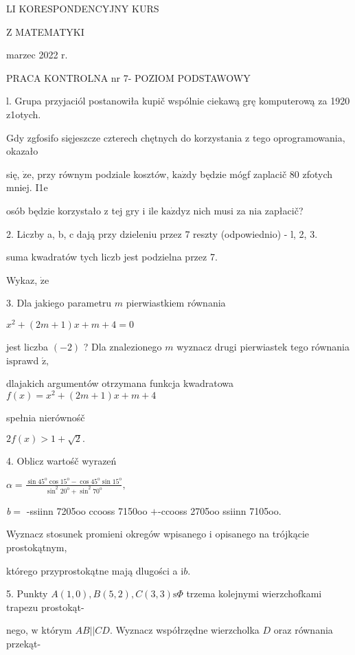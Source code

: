\documentclass[a4paper,12pt]{article}
\begin{document}
LI KORESPONDENCYJNY KURS

Z MATEMATYKI

marzec 2022 r.

PRACA KONTROLNA nr 7- POZIOM PODSTAWOWY

l. Grupa przyjaciól postanowiła kupič wspólnie ciekawą grę komputerową za 1920 z1otych.

Gdy zgfosifo sięjeszcze czterech chętnych do korzystania $\mathrm{z}$ tego oprogramowania, okazało

się, $\dot{\mathrm{z}}\mathrm{e}$, przy równym podziale kosztów, $\mathrm{k}\mathrm{a}\dot{\mathrm{z}}\mathrm{d}\mathrm{y}$ będzie mógf zaplacič 80 zfotych mniej. I1e

osób będzie korzystało $\mathrm{z}$ tej gry $\mathrm{i}$ ile $\mathrm{k}\mathrm{a}\dot{\mathrm{z}}\mathrm{d}\mathrm{y}\mathrm{z}$ nich musi za $\mathrm{n}\mathrm{i}\mathrm{a}$ zapłacič?

2. Liczby a, b, c dają przy dzieleniu przez 7 reszty (odpowiednio) - l, 2, 3.

suma kwadratów tych liczb jest podzielna przez 7.

Wykaz, $\dot{\mathrm{z}}\mathrm{e}$

3. Dla jakiego parametru $m$ pierwiastkiem równania

$x^{2}+(2m+1)x+m+4=0$

jest liczba $(-2)$ ? Dla znalezionego $m$ wyznacz drugi pierwiastek tego równania $\mathrm{i}\mathrm{s}$prawd $\acute{\mathrm{z}},$

dlajakich argumentów otrzymana funkcja kwadratowa $f(x)=x^{2}+(2m+1)x+m+4$

spełnia nierównośč

$2f(x)>1+\sqrt{2}.$

4. Oblicz wartośč wyrazeń

$\displaystyle \alpha=\frac{\sin 45^{\mathrm{o}}\cos 15^{\mathrm{o}}-\cos 45^{\mathrm{o}}\sin 15^{\mathrm{o}}}{\sin^{2}20^{\mathrm{o}}+\sin^{2}70^{\mathrm{o}}},$

{\it b}$=$ -ssiinn 7205oo ccooss 7150oo $+$-ccooss 2705oo ssiinn 7105oo.

Wyznacz stosunek promieni okregów wpisanego $\mathrm{i}$ opisanego na trójkącie prostokątnym,

którego przyprostokątne mają dlugości a $\mathrm{i}b.$

5. Punkty $A(1,0), B(5,2), C(3,3) \mathrm{s}\Phi$ trzema kolejnymi wierzchofkami trapezu prostokąt-

nego, $\mathrm{w}$ którym $AB||CD$. Wyznacz współrzędne wierzcholka $D$ oraz równania przekąt-
\end{document}
